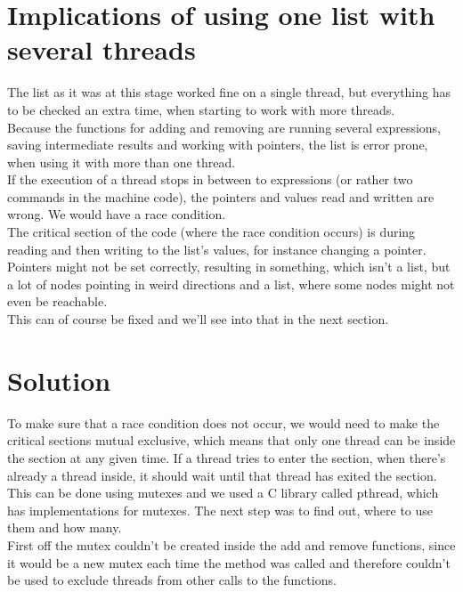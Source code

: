 \section{Implications of using one list with several threads}
The list as it was at this stage worked fine on a single thread, but everything has to be checked an extra time, when starting to work with more threads.\\

Because the functions for adding and removing are running several expressions, saving intermediate results and working with pointers, the list is error prone, when using it with more than one thread.\\

If the execution of a thread stops in between to expressions (or rather two commands in the machine code), the pointers and values read and written are wrong. We would have a race condition.\\

The critical section of the code (where the race condition occurs) is during reading and then writing to the list's values, for instance changing a pointer. Pointers might not be set correctly, resulting in something, which isn't a list, but a lot of nodes pointing in weird directions and a list, where some nodes might not even be reachable.\\

This can of course be fixed and we'll see into that in the next section.

\section{Solution}
To make sure that a race condition does not occur, we would need to make the critical sections mutual exclusive, which means that only one thread can be inside the section at any given time. If a thread tries to enter the section, when there's already a thread inside, it should wait until that thread has exited the section.\\

This can be done using mutexes and we used a C library called pthread, which has implementations for mutexes. The next step was to find out, where to use them and how many.\\

First off the mutex couldn't be created inside the add and remove functions, since it would be a new mutex each time the method was called and therefore couldn't be used to exclude threads from other calls to the functions.\\

